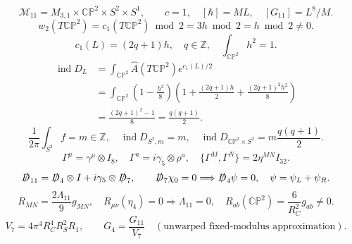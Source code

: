 \[
\mathcal M_{11}=M_{3,1}\times\mathbb{CP}^{2}\times S^2\times S^1,
\qquad c=1,\quad [\hbar]=ML,\quad [G_{11}]=L^8/M.
\]
\[
 w_2(T\mathbb{CP}^{2})=c_1(T\mathbb{CP}^{2})\bmod2
 =3h\bmod2=h\bmod2\ne0.
\]
\[
 c_1(L)=(2q+1)h,\quad q\in\mathbb{Z},\quad \int_{\mathbb{CP}^{2}}h^2=1.
\]
\begin{align*}
\operatorname{ind}D_L
 &=\int_{\mathbb{CP}^{2}}\widehat A(T\mathbb{CP}^{2}) e^{c_1(L)/2}\\
 &=\int_{\mathbb{CP}^{2}}\left(1-\frac{h^2}{8}\right)
  \left(1+\frac{(2q+1)h}{2}+\frac{(2q+1)^2h^2}{8}\right)\\
 &=\frac{(2q+1)^2-1}{8}=\frac{q(q+1)}{2}.
\end{align*}
\[
\frac1{2\pi}\int_{S^2} f=m\in\mathbb{Z},\quad
 \operatorname{ind}D_{S^2,m}=m,
\quad\operatorname{ind}D_{\mathbb{CP}^{2}\times S^2}
 =m\frac{q(q+1)}2.
\]
\[
\Gamma^\mu=\gamma^\mu\otimes I_8,
\quad\Gamma^a=i\gamma_5\otimes\rho^a,
\quad\{\Gamma^M,\Gamma^N\}=2\eta^{MN}I_{32}.
\]
\[
\slashed D_{11}=\slashed D_4\otimes I+i\gamma_5\otimes\slashed D_7,
\qquad\slashed D_7\chi_0=0\Longrightarrow\slashed D_4\psi=0,
\quad\psi=\psi_L+\psi_R.
\]
\[
R_{MN}=\frac{2\Lambda_{11}}9 g_{MN},\quad
R_{\mu\nu}(\eta_4)=0\Longrightarrow\Lambda_{11}=0,
\quad R_{ab}(\mathbb{CP}^{2})=\frac{6}{R_C^2}g_{ab}\ne0.
\]
\[
V_7=4\pi^4 R_C^4R_S^2 R_1,\qquad
G_4=\frac{G_{11}}{V_7}\quad(\text{unwarped fixed-modulus approximation}).
\]
